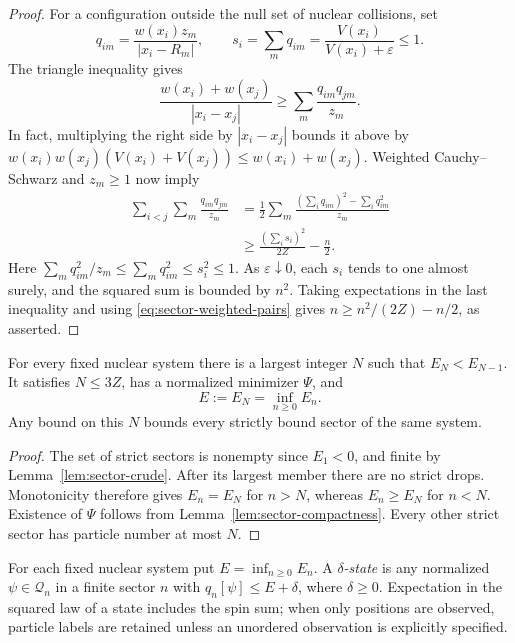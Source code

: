 \begin{proof}
For a configuration outside the null set of nuclear collisions, set
\[
 q_{im}=\frac{w(x_i)z_m}{|x_i-R_m|},\qquad
 s_i=\sum_mq_{im}=\frac{V(x_i)}{V(x_i)+\varepsilon}\leq1.
\]
The triangle inequality gives
\[
 \frac{w(x_i)+w(x_j)}{|x_i-x_j|}
 \geq\sum_m\frac{q_{im}q_{jm}}{z_m}.
\]
In fact, multiplying the right side by $|x_i-x_j|$ bounds it above by
$w(x_i)w(x_j)(V(x_i)+V(x_j))\leq w(x_i)+w(x_j)$.
Weighted Cauchy--Schwarz and $z_m\geq1$ now imply
\begin{align*}
 \sum_{i<j}\sum_m\frac{q_{im}q_{jm}}{z_m}
 &=\frac12\sum_m\frac{(\sum_iq_{im})^2-\sum_iq_{im}^2}{z_m}\\
 &\geq\frac{(\sum_i s_i)^2}{2Z}-\frac n2.
\end{align*}
Here $\sum_mq_{im}^2/z_m\leq\sum_mq_{im}^2\leq s_i^2\leq1$.
As $\varepsilon\downarrow0$, each $s_i$ tends to one almost surely,
and the squared sum is bounded by $n^2$.  Taking expectations in the
last inequality and using \eqref{eq:sector-weighted-pairs} gives
$n\geq n^2/(2Z)-n/2$, as asserted.
\end{proof}

\begin{lemma}
\label{lem:sector-global-minimum}
For every fixed nuclear system there is a largest integer $N$ such
that $E_N<E_{N-1}$.  It satisfies $N\leq3Z$, has a normalized
minimizer $\Psi$, and
\begin{equation}\label{eq:sector-global-minimum}
 E:=E_N=\inf_{n\geq0}E_n.
\end{equation}
Any bound on this $N$ bounds every strictly bound sector of the same
system.
\end{lemma}

\begin{proof}
The set of strict sectors is nonempty since $E_1<0$, and finite by
Lemma~\ref{lem:sector-crude}.  After its largest member there are no
strict drops.  Monotonicity therefore gives $E_n=E_N$ for $n>N$,
whereas $E_n\geq E_N$ for $n<N$.  Existence of $\Psi$ follows from
Lemma~\ref{lem:sector-compactness}.  Every other strict sector has
particle number at most $N$.
\end{proof}

For each fixed nuclear system put $E=\inf_{n\ge0}E_n$.
A \emph{$\delta$-state} is any normalized $\psi\in\mathcal Q_n$ in
a finite sector $n$ with $q_n[\psi]\le E+\delta$, where $\delta\ge0$.
Expectation in the squared law of a state includes the spin sum;
when only positions are observed, particle labels are retained unless
an unordered observation is explicitly specified.

